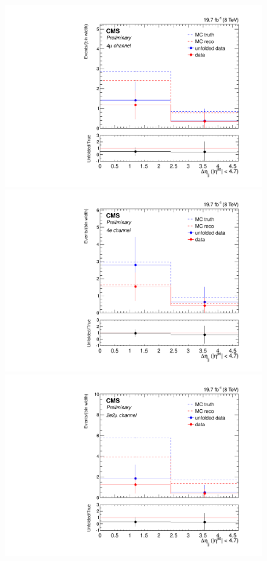 \begin{figure}[hbtp]
  \begin{center}
    \includegraphics[width=\cmsFigWidth]{Figures/Deta_ZZTo4m_Mad_fr_binwidth}
    \includegraphics[width=\cmsFigWidth]{Figures/Deta_ZZTo4e_Mad_fr_binwidth}
    \includegraphics[width=\cmsFigWidth]{Figures/Deta_ZZTo2e2m_Mad_fr_binwidth}  

\end{center}
\end{figure}
